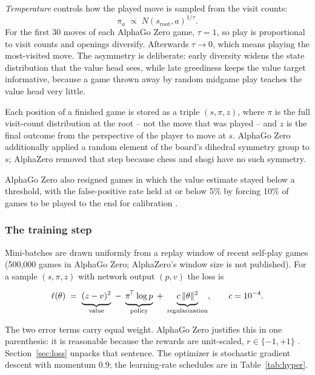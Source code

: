 \emph{Temperature} controls how the played move is sampled from the visit counts:
\begin{equation}
\pi_a \;\propto\; N(s_{\mathrm{root}}, a)^{1/\tau}.
\label{eq:temperature}
\end{equation}
For the first 30 moves of each AlphaGo Zero game, $\tau = 1$, so play is
proportional to visit counts and openings diversify. Afterwards $\tau \to 0$,
which means playing the most-visited move. The asymmetry is deliberate: early
diversity widens the state distribution that the value head sees, while late
greediness keeps the value target informative, because a game thrown away by
random midgame play teaches the value head very little.

Each position of a finished game is stored as a triple $(s, \pi, z)$, where
$\pi$ is the full visit-count distribution at the root -- not the move that was
played -- and $z$ is the final outcome from the perspective of the player to move
at $s$. AlphaGo Zero additionally applied a random element of the board's
dihedral symmetry group to $s$; AlphaZero removed that step because chess and
shogi have no such symmetry.

AlphaGo Zero also resigned games in which the value estimate stayed below a
threshold, with the false-positive rate held at or below 5\% by forcing 10\% of
games to be played to the end for calibration \citep{silver2017alphagozero}.

\subsubsection{The training step}

Mini-batches are drawn uniformly from a replay window of recent self-play games
(500{,}000 games in AlphaGo Zero; AlphaZero's window size is not published). For
a sample $(s,\pi,z)$ with network output $(p,v)$ the loss is

\begin{equation}
\ell(\theta) \;=\; \underbrace{(z-v)^2\vphantom{\big|}}_{\text{value}}
\;-\; \underbrace{\pi^{\!\top} \log p\vphantom{\big|}}_{\text{policy}}
\;+\; \underbrace{c\,\|\theta\|^2\vphantom{\big|}}_{\text{regularization}},
\qquad c = 10^{-4}.
\label{eq:alphazero-loss}
\end{equation}

The two error terms carry equal weight. AlphaGo Zero justifies this in one
parenthesis: it is reasonable because the rewards are unit-scaled, $r \in
\{-1,+1\}$ \citep{silver2017alphagozero}. Section~\ref{sec:loss} unpacks that
sentence. The optimizer is stochastic gradient descent with momentum $0.9$; the
learning-rate schedules are in Table~\ref{tab:hyper}.

